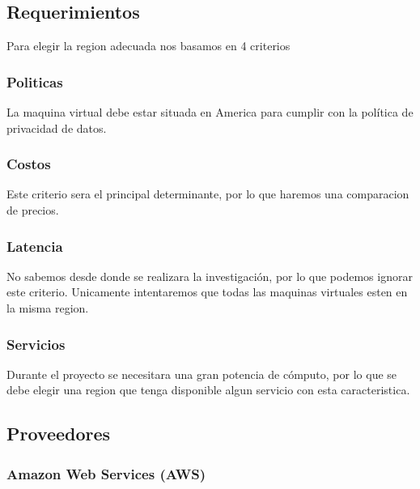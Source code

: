 \documentclass{article}
\begin{document}
\subsection{Requerimientos}
    
Para elegir la region adecuada nos basamos en 4 criterios \cite{choosing_region}
  \subsubsection*{Politicas}
    La maquina virtual debe estar situada en America para cumplir con la política de privacidad de datos.
  \subsubsection*{Costos}
    Este criterio sera el principal determinante, por lo que haremos una comparacion de precios.
  \subsubsection*{Latencia}
    No sabemos desde donde se realizara la investigación, por lo que podemos ignorar este criterio. Unicamente intentaremos que todas las maquinas virtuales esten en la misma region.
  \subsubsection*{Servicios}
    Durante el proyecto se necesitara una gran potencia de cómputo, por lo que se debe elegir una region que tenga disponible algun servicio con esta caracteristica.

  \subsection{Proveedores}

  \subsubsection*{Amazon Web Services (AWS)}
    
\end{document}
